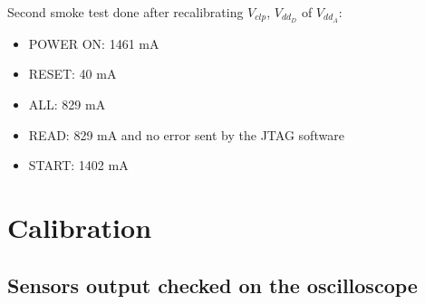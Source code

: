 \documentclass[a4papper, 10pt]{article}
\begin{document}
     Second smoke test done after recalibrating $V_{clp}$, $V_{dd_D}$ of $V_{dd_A}$:
     
     \begin{itemize}
       \item POWER ON: 1461 mA
       \item RESET: 40 mA
       \item ALL: 829 mA
       \item READ: 829 mA and no error sent by the JTAG software
       \item START: 1402 mA
     \end{itemize}
 
  \section{Calibration}
    \subsection{Sensors output checked on the oscilloscope}
\end{document}
